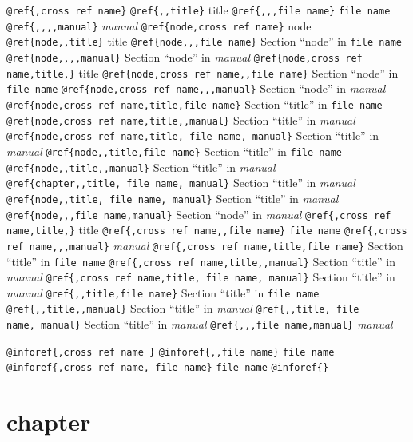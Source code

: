 \documentclass{book}
\makeatletter
\renewcommand\mainmatter{\clearpage\@mainmattertrue\pagenumbering{arabic}}
\renewcommand{\_}{\Texinfounderscore\discretionary{}{}{}}
\makeatother
\begin{document}
\begin{titlepage}
\texttt{@ref\{,cross ref name\}} 
\texttt{@ref\{{,}{,}title\}} title
\texttt{@ref\{{,}{,},file name\}} \texttt{file name}
\texttt{@ref\{{,}{,}{,}{,}manual\}} \textsl{manual}
\texttt{@ref\{node,cross ref name\}} node
\texttt{@ref\{node{,}{,}title\}} title
\texttt{@ref\{node{,}{,},file name\}} Section ``node'' in \texttt{file name}
\texttt{@ref\{node{,}{,}{,}{,}manual\}} Section ``node'' in \textsl{manual}
\texttt{@ref\{node,cross ref name,title,\}} title
\texttt{@ref\{node,cross ref name{,}{,}file name\}} Section ``node'' in \texttt{file name}
\texttt{@ref\{node,cross ref name{,}{,},manual\}} Section ``node'' in \textsl{manual}
\texttt{@ref\{node,cross ref name,title,file name\}} Section ``title'' in \texttt{file name}
\texttt{@ref\{node,cross ref name,title{,}{,}manual\}} Section ``title'' in \textsl{manual}
\texttt{@ref\{node,cross ref name,title,\ file name,\ manual\}} Section ``title'' in \textsl{manual}
\texttt{@ref\{node{,}{,}title,file name\}} Section ``title'' in \texttt{file name}
\texttt{@ref\{node{,}{,}title{,}{,}manual\}} Section ``title'' in \textsl{manual}
\texttt{@ref\{chapter{,}{,}title,\ file name,\ manual\}} Section ``title'' in \textsl{manual}
\texttt{@ref\{node{,}{,}title,\ file name,\ manual\}} Section ``title'' in \textsl{manual}
\texttt{@ref\{node{,}{,},file name,manual\}} Section ``node'' in \textsl{manual}
\texttt{@ref\{,cross ref name,title,\}} title
\texttt{@ref\{,cross ref name{,}{,}file name\}} \texttt{file name}
\texttt{@ref\{,cross ref name{,}{,},manual\}} \textsl{manual}
\texttt{@ref\{,cross ref name,title,file name\}} Section ``title'' in \texttt{file name}
\texttt{@ref\{,cross ref name,title{,}{,}manual\}} Section ``title'' in \textsl{manual}
\texttt{@ref\{,cross ref name,title,\ file name,\ manual\}} Section ``title'' in \textsl{manual}
\texttt{@ref\{{,}{,}title,file name\}} Section ``title'' in \texttt{file name}
\texttt{@ref\{{,}{,}title{,}{,}manual\}} Section ``title'' in \textsl{manual}
\texttt{@ref\{{,}{,}title,\ file name,\ manual\}} Section ``title'' in \textsl{manual}
\texttt{@ref\{{,}{,},file name,manual\}} \textsl{manual}

\texttt{@inforef\{,cross ref name \}} 
\texttt{@inforef\{{,}{,}file name\}} \texttt{file name}
\texttt{@inforef\{,cross ref name,\ file name\}} \texttt{file name}
\texttt{@inforef\{\}} 


\end{titlepage}
\pagestyle{single}%
\mainmatter
\tableofcontents\newpage
\label{anchor:Top}%
\chapter{{chapter}}
\label{anchor:chapter}%
\end{document}
